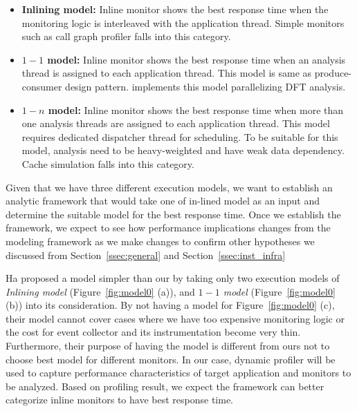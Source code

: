 \begin{itemize}

    \item{{\bf Inlining model:} Inline monitor shows the best response time
            when the monitoring logic is interleaved with the application
    thread. Simple monitors such as call graph profiler falls into this
    category.}

    \item{{\bf $1-1$ model:} Inline monitor shows the best response time when
            an analysis thread is assigned to each application thread. This
    model is same as produce-consumer design pattern. \sreplica implements this
    model parallelizing DFT analysis.}

    \item{{\bf $1-n$ model:} Inline monitor shows the best response time when
            more than one analysis threads are assigned to each application
    thread. This model requires dedicated dispatcher thread for scheduling. To
    be suitable for this model, analysis need to be heavy-weighted and have
    weak data dependency. Cache simulation falls into this category.}

\end{itemize}

%
Given that we have three different execution models, we want to establish an
analytic framework that would take one of in-lined model as an input and
determine the suitable model for the best response time. Once we establish the
framework, we expect to see how performance implications changes from the
modeling framework as we make changes to confirm other hypotheses we discussed
from Section~\ref{ssec:general} and Section~\ref{ssec:inst_infra} 

Ha\etal\cite{cab:oopsala2009} proposed a model simpler than our by taking only
two execution models of {\it Inlining model} (Figure~\ref{fig:model0} (a)), and
{\it $1-1$ model} (Figure~\ref{fig:model0} (b)) into its consideration. By not
having a model for Figure~\ref{fig:model0} (c), their model cannot cover cases
where we have too expensive monitoring logic or the cost for event collector
and its instrumentation become very thin. Furthermore, their purpose of having
the model is different from ours not to choose best model for different
monitors.  In our case, dynamic profiler will be used to capture performance
characteristics of target application and monitors to be analyzed. Based on
profiling result, we expect the framework can better categorize inline monitors 
to have best response time.

